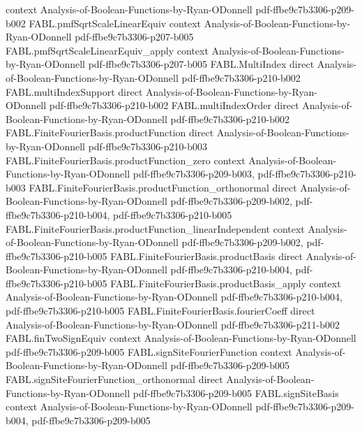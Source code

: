 \begin{theorem}
  {context}
  {Analysis-of-Boolean-Functions-by-Ryan-ODonnell}
  {pdf-ffbe9c7b3306-p209-b002}
\proofstep
  {FABL.pmfSqrtScaleLinearEquiv}
  {context}
  {Analysis-of-Boolean-Functions-by-Ryan-ODonnell}
  {pdf-ffbe9c7b3306-p207-b005}
\proofstep
  {FABL.pmfSqrtScaleLinearEquiv_apply}
  {context}
  {Analysis-of-Boolean-Functions-by-Ryan-ODonnell}
  {pdf-ffbe9c7b3306-p207-b005}
\proofstep
  {FABL.MultiIndex}
  {direct}
  {Analysis-of-Boolean-Functions-by-Ryan-ODonnell}
  {pdf-ffbe9c7b3306-p210-b002}
\proofstep
  {FABL.multiIndexSupport}
  {direct}
  {Analysis-of-Boolean-Functions-by-Ryan-ODonnell}
  {pdf-ffbe9c7b3306-p210-b002}
\proofstep
  {FABL.multiIndexOrder}
  {direct}
  {Analysis-of-Boolean-Functions-by-Ryan-ODonnell}
  {pdf-ffbe9c7b3306-p210-b002}
\proofstep
  {FABL.FiniteFourierBasis.productFunction}
  {direct}
  {Analysis-of-Boolean-Functions-by-Ryan-ODonnell}
  {pdf-ffbe9c7b3306-p210-b003}
\proofstep
  {FABL.FiniteFourierBasis.productFunction_zero}
  {context}
  {Analysis-of-Boolean-Functions-by-Ryan-ODonnell}
  {pdf-ffbe9c7b3306-p209-b003,
    pdf-ffbe9c7b3306-p210-b003}
\proofstep
  {FABL.FiniteFourierBasis.productFunction_orthonormal}
  {direct}
  {Analysis-of-Boolean-Functions-by-Ryan-ODonnell}
  {pdf-ffbe9c7b3306-p209-b002,
    pdf-ffbe9c7b3306-p210-b004,
    pdf-ffbe9c7b3306-p210-b005}
\proofstep
  {FABL.FiniteFourierBasis.productFunction_linearIndependent}
  {context}
  {Analysis-of-Boolean-Functions-by-Ryan-ODonnell}
  {pdf-ffbe9c7b3306-p209-b002,
    pdf-ffbe9c7b3306-p210-b005}
\proofstep
  {FABL.FiniteFourierBasis.productBasis}
  {direct}
  {Analysis-of-Boolean-Functions-by-Ryan-ODonnell}
  {pdf-ffbe9c7b3306-p210-b004,
    pdf-ffbe9c7b3306-p210-b005}
\proofstep
  {FABL.FiniteFourierBasis.productBasis_apply}
  {context}
  {Analysis-of-Boolean-Functions-by-Ryan-ODonnell}
  {pdf-ffbe9c7b3306-p210-b004,
    pdf-ffbe9c7b3306-p210-b005}
\proofstep
  {FABL.FiniteFourierBasis.fourierCoeff}
  {direct}
  {Analysis-of-Boolean-Functions-by-Ryan-ODonnell}
  {pdf-ffbe9c7b3306-p211-b002}
\proofstep
  {FABL.finTwoSignEquiv}
  {context}
  {Analysis-of-Boolean-Functions-by-Ryan-ODonnell}
  {pdf-ffbe9c7b3306-p209-b005}
\proofstep
  {FABL.signSiteFourierFunction}
  {context}
  {Analysis-of-Boolean-Functions-by-Ryan-ODonnell}
  {pdf-ffbe9c7b3306-p209-b005}
\proofstep
  {FABL.signSiteFourierFunction_orthonormal}
  {direct}
  {Analysis-of-Boolean-Functions-by-Ryan-ODonnell}
  {pdf-ffbe9c7b3306-p209-b005}
\proofstep
  {FABL.signSiteBasis}
  {context}
  {Analysis-of-Boolean-Functions-by-Ryan-ODonnell}
  {pdf-ffbe9c7b3306-p209-b004,
    pdf-ffbe9c7b3306-p209-b005}

\end{theorem}
